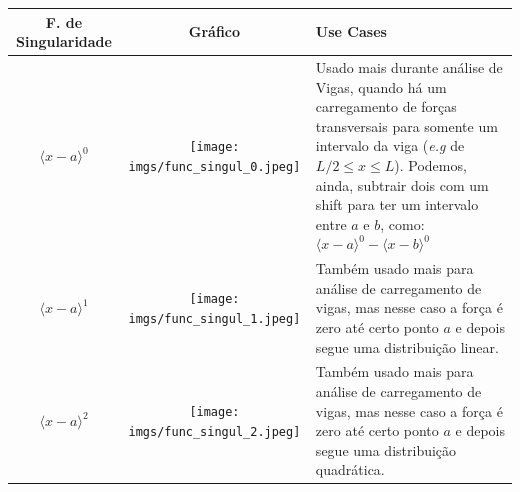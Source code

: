 \documentclass{article}
\begin{document}
\begin{table}[h]
    \centering
    \begin{tabular}{|c|c|l|} \hline
        \textbf{F. de Singularidade}                                   & \textbf{Gráfico} & \textbf{Use Cases}                                                             \\ \hline
        $\langle x - a\rangle^0$                                       &
        \begin{minipage}{.3\textwidth}
            \centering
            \texttt{[image: imgs/func\_singul\_0.jpeg]}
        \end{minipage}  &
        \begin{minipage}{.4\textwidth}
            Usado mais durante análise de Vigas, quando há um carregamento de forças transversais para somente um intervalo da viga (\emph{e.g} de $L/2 \le x \le L$). Podemos,
            ainda, subtrair dois com um shift para ter um intervalo entre $a$ e $b$, como: $\langle x - a\rangle^0 - \langle x - b\rangle^0$
        \end{minipage} \\ \hline

        $\langle x - a\rangle^1$                                       &
        \begin{minipage}{.3\textwidth}
            \centering
            \texttt{[image: imgs/func\_singul\_1.jpeg]}
        \end{minipage}  &
        \begin{minipage}{.4\textwidth}
            Também usado mais para análise de carregamento de vigas, mas nesse caso a força é zero até certo ponto $a$ e depois segue uma distribuição linear.
        \end{minipage}                  \\ \hline

        $\langle x - a\rangle^2$                                       &
        \begin{minipage}{.3\textwidth}
            \centering
            \texttt{[image: imgs/func\_singul\_2.jpeg]}
        \end{minipage}  &
        \begin{minipage}{.4\textwidth}
            Também usado mais para análise de carregamento de vigas, mas nesse caso a força é zero até certo ponto $a$ e depois segue uma distribuição quadrática.
        \end{minipage}              \\ \hline


\end{tabular}
\end{table}
\end{document}
